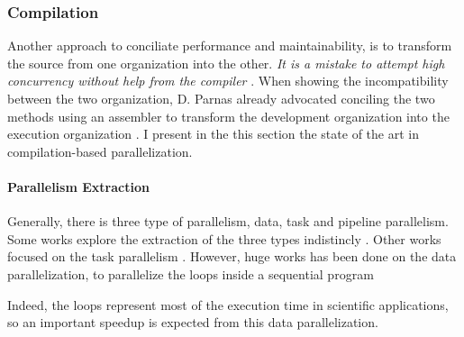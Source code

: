 




\subsubsection{Compilation}

Another approach to conciliate performance and maintainability, is to transform the source from one organization into the other.
\textit{It is a mistake to attempt high concurrency without help from the compiler} \cite{Behren2003}.
When showing the incompatibility between the two organization, D. Parnas already advocated conciling the two methods using an assembler to transform the development organization into the execution organization \cite{Parnas1972}.
I present in the this section the state of the art in compilation-based parallelization.


\paragraph{Parallelism Extraction}

Generally, there is three type of parallelism, data, task and pipeline parallelism.
Some works explore the extraction of the three types indistincly \cite{Li2012}.
Other works focused on the task parallelism \cite{Rinard1996}.
However, huge works has been done on the data parallelization, to parallelize the loops inside a sequential program \cite{Mauras1989,Amarasinghe1995,Yuki2013,Banerjee2013,Radoi2014}

Indeed, the loops represent most of the execution time in scientific applications, so an important speedup is expected from this data parallelization.

